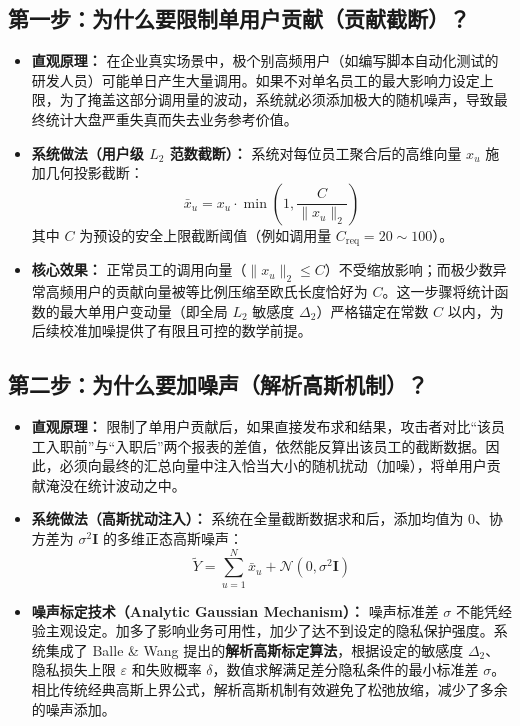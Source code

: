 \subsection{第一步：为什么要限制单用户贡献（贡献截断）？}
\begin{itemize}[leftmargin=2em]
  \item \textbf{直观原理：} 在企业真实场景中，极个别高频用户（如编写脚本自动化测试的研发人员）可能单日产生大量调用。如果不对单名员工的最大影响力设定上限，为了掩盖这部分调用量的波动，系统就必须添加极大的随机噪声，导致最终统计大盘严重失真而失去业务参考价值。
  \item \textbf{系统做法（用户级 $L_2$ 范数截断）：} 系统对每位员工聚合后的高维向量 $x_u$ 施加几何投影截断：
  \begin{equation}
    \bar{x}_u = x_u \cdot \min\left(1, \frac{C}{\|x_u\|_2}\right)
    \label{eq:l2_clipping}
  \end{equation}
  其中 $C$ 为预设的安全上限截断阈值（例如调用量 $C_{\text{req}}=20 \sim 100$）。
  \item \textbf{核心效果：} 正常员工的调用向量（$\|x_u\|_2 \le C$）不受缩放影响；而极少数异常高频用户的贡献向量被等比例压缩至欧氏长度恰好为 $C$。这一步骤将统计函数的最大单用户变动量（即全局 $L_2$ 敏感度 $\Delta_2$）严格锚定在常数 $C$ 以内，为后续校准加噪提供了有限且可控的数学前提。
\end{itemize}

\subsection{第二步：为什么要加噪声（解析高斯机制）？}
\begin{itemize}[leftmargin=2em]
  \item \textbf{直观原理：} 限制了单用户贡献后，如果直接发布求和结果，攻击者对比“该员工入职前”与“入职后”两个报表的差值，依然能反算出该员工的截断数据。因此，必须向最终的汇总向量中注入恰当大小的随机扰动（加噪），将单用户贡献淹没在统计波动之中。
  \item \textbf{系统做法（高斯扰动注入）：} 系统在全量截断数据求和后，添加均值为 0、协方差为 $\sigma^2 \mathbf{I}$ 的多维正态高斯噪声：
  \begin{equation}
    \tilde{Y} = \sum_{u=1}^N \bar{x}_u + \mathcal{N}\left(0, \sigma^2 \mathbf{I}\right)
    \label{eq:gaussian_mechanism}
  \end{equation}
  \item \textbf{噪声标定技术（Analytic Gaussian Mechanism）：} 噪声标准差 $\sigma$ 不能凭经验主观设定。加多了影响业务可用性，加少了达不到设定的隐私保护强度。系统集成了 Balle \& Wang 提出的\textbf{解析高斯标定算法}，根据设定的敏感度 $\Delta_2$、隐私损失上限 $\varepsilon$ 和失败概率 $\delta$，数值求解满足差分隐私条件的最小标准差 $\sigma$。相比传统经典高斯上界公式，解析高斯机制有效避免了松弛放缩，减少了多余的噪声添加。
\end{itemize}

